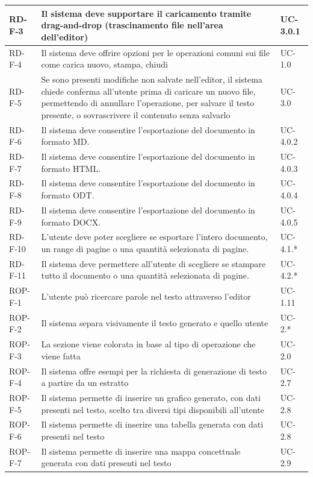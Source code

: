 \documentclass[11pt,a4paper]{article}
\begin{document}
\begin{longtable}{|p{}|>{\raggedright\arraybackslash}p{}|p{}|}
\hline
RD-F-3 & Il sistema deve supportare il caricamento tramite drag-and-drop (trascinamento file nell'area dell'editor) & UC-3.0.1 \\
\hline
RD-F-4 & Il sistema deve offrire opzioni per le operazioni comuni sui file come carica nuovo, stampa, chiudi & UC-1.0 \\
\hline
RD-F-5 & Se sono presenti modifiche non salvate nell'editor, il sistema chiede conferma all'utente prima di caricare un nuovo file, permettendo di annullare l'operazione, per salvare il testo presente, o sovrascrivere il contenuto senza salvarlo & UC-3.0 \\
\hline
RD-F-6 & Il sistema deve consentire l'esportazione del documento in formato MD. & UC-4.0.2 \\
\hline
RD-F-7 & Il sistema deve consentire l'esportazione del documento in formato HTML. & UC-4.0.3 \\
\hline
RD-F-8 & Il sistema deve consentire l'esportazione del documento in formato ODT. & UC-4.0.4 \\
\hline
RD-F-9 & Il sistema deve consentire l'esportazione del documento in formato DOCX. & UC-4.0.5 \\
\hline
RD-F-10 & L'utente deve poter scegliere se esportare l'intero documento, un range di pagine o una quantità selezionata di pagine. & UC-4.1.*\\
\hline
RD-F-11 & Il sistema deve permettere all'utente di scegliere se stampare tutto il documento o una quantità selezionata di pagine. & UC-4.2.*\\
\hline
ROP-F-1 & L'utente può ricercare parole nel testo attraverso l'editor & UC-1.11 \\
\hline
ROP-F-2 & Il sistema separa visivamente il testo generato e quello utente & UC-2.* \\
\hline
ROP-F-3 & La sezione viene colorata in base al tipo di operazione che viene fatta & UC-2.0 \\
\hline
ROP-F-4 & Il sistema offre esempi per la richiesta di generazione di testo a partire da un estratto & UC-2.7 \\
\hline
ROP-F-5 & Il sistema permette di inserire un grafico generato, con dati presenti nel testo, scelto tra diversi tipi disponibili all'utente & UC-2.8 \\
\hline
ROP-F-6 & Il sistema permette di inserire una tabella generata con dati presenti nel testo & UC-2.8 \\
\hline
ROP-F-7 & Il sistema permette di inserire una mappa concettuale generata con dati presenti nel testo & UC-2.9 \\

\end{longtable}
\end{document}
